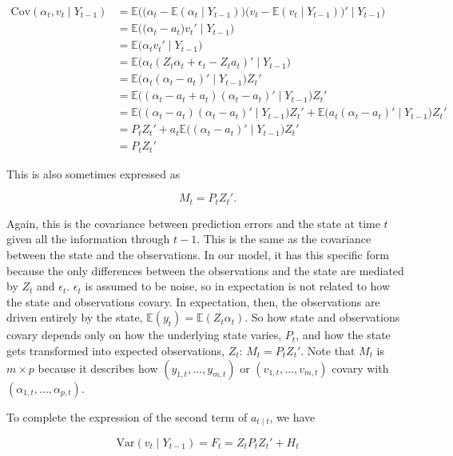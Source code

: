 \documentclass{tufte-book}
\begin{document}
\begin{align*}
\text{Cov}(\alpha_t, v_t \mid Y_{t-1}) &= \mathbb{E} \Big( \big(\alpha_t - \mathbb{E}(\alpha_t \mid Y_{t-1}) \big) \big(v_t - \mathbb{E}(v_t \mid Y_{t-1}) \big)' \mid Y_{t-1} \Big) \\
&= \mathbb{E} \Big( \big(\alpha_t - a_t \big) v_t' \mid Y_{t-1} \Big) \\
&= \mathbb{E} \Big( \alpha_t v_t' \mid Y_{t-1} \Big) \\
&= \mathbb{E} \Big( \alpha_t (Z_t \alpha_t + \epsilon_t - Z_t a_t)' \mid Y_{t-1} \Big) \\
&= \mathbb{E} \Big( \alpha_t (\alpha_t - a_t)' \mid Y_{t-1} \Big) Z_t' \\
&= \mathbb{E} \Big( (\alpha_t - a_t + a_t) (\alpha_t - a_t)' \mid Y_{t-1} \Big) Z_t' \\
&= \mathbb{E} \Big( (\alpha_t - a_t) (\alpha_t - a_t)' \mid Y_{t-1} \Big) Z_t' + \mathbb{E} \Big( a_t (\alpha_t - a_t)' \mid Y_{t-1} \Big) Z_t' \\
&= P_t Z_t' + a_t \mathbb{E} \Big( (\alpha_t - a_t)' \mid Y_{t-1} \Big) Z_t' \\
&= P_t Z_t'
\end{align*}

\noindent This is also sometimes expressed as 

\[
M_t = P_t Z_t'.
\]

\noindent Again, this is the covariance between prediction errors and the state at time $t$ given all the information through $t-1$. This is the same as the covariance between the state and the observations. In our model, it has this specific form because the only differences between the observations and the state are mediated by $Z_t$ and $\epsilon_t$. $\epsilon_t$ is assumed to be noise, so in expectation is not related to how the state and observations covary. In expectation, then, the observations are driven entirely by the state, $\mathbb{E}(y_t) = \mathbb{E}(Z_t \alpha_t)$. So how state and observations covary depends only on how the underlying state varies, $P_t$, and how the state gets transformed into expected observations, $Z_t$: $M_t = P_t Z_t'$. Note that $M_t$ is $m \times p$ because it describes how $(y_{1,t}, ..., y_{m,t})$ or $(v_{1,t}, ..., v_{m,t})$ covary with $(\alpha_{1, t}, ..., \alpha_{p,t})$.


To complete the expression of the second term of $a_{t \mid t}$, we have

\[
\text{Var}(v_t \mid Y_{t-1}) = F_t =  Z_t P_t Z_t' + H_t
\]
\end{document}
